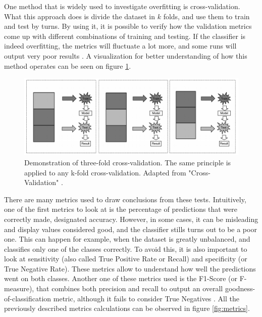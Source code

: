 One method that is widely used to investigate overfitting is cross-validation. What this approach does is divide the dataset in $k$ folds, and use them to train and test by turns. By using it, it is possible to verify how the validation metrics come up with different combinations of training and testing. If the classifier is indeed overfitting, the metrics will fluctuate a lot more, and some runs will output very poor results \cite{Refaeilzadeh2009}. A visualization for better understanding of how this method operates can be seen on figure \ref{fig:cross_val}. 

\begin{figure}[h]
	\centering
	\includegraphics[width=\textwidth]{../images/results/cross_val.png}
	\caption{Demonstration of three-fold cross-validation. The same principle is applied to any k-fold cross-validation. Adapted from "Cross-Validation" \cite{Refaeilzadeh2009}.} 
	\label{fig:cross_val}
\end{figure}

There are many metrics used to draw conclusions from these tests. Intuitively, one of the first metrics to look at is the percentage of predictions that were correctly made, designated accuracy. However, in some cases, it can be misleading and display values considered good, and the classifier stills turns out to be a poor one. This can happen for example, when the dataset is greatly unbalanced, and classifies only one of the classes correctly. To avoid this, it is also important to look at sensitivity (also called True Positive Rate or Recall) and specificity (or True Negative Rate). These metrics allow to understand how well the predictions went on both classes. Another one of these metrics used is the F1-Score (or F-measure), that combines both precision and recall to output an overall goodness-of-classification metric, although it fails to consider True Negatives \cite{powers2011evaluation}. All the previously described metrics calculations can be observed in figure \ref{fig:metrics}. 


